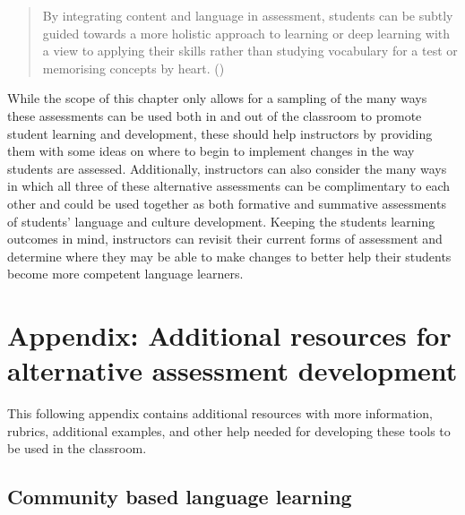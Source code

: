 \documentclass[output=paper]{langscibook}
\begin{document}
\begin{quote}
By integrating content and language in assessment, students can be subtly guided towards a more holistic approach to learning or deep learning with a view to applying their skills rather than studying vocabulary for a test or memorising concepts by heart. (\citeyear[98]{Kunschak2020})
\end{quote}

While the scope of this chapter only allows for a sampling of the many ways these assessments can be used both in and out of the classroom to promote student learning and development, these should help instructors by providing them with some ideas on where to begin to implement changes in the way students are assessed. Additionally, instructors can also consider the many ways in which all three of these alternative assessments can be complimentary to each other and could be used together as both formative and summative assessments of students’ language and culture development. Keeping the students learning outcomes in mind, instructors can revisit their current forms of assessment and determine where they may be able to make changes to better help their students become more competent language learners.




\section*{Appendix: Additional resources for alternative assessment development}

This following appendix contains additional resources with more information, rubrics, additional examples, and other help needed for developing these tools to be used in the classroom.

\subsection*{Community based language learning}
\end{document}
